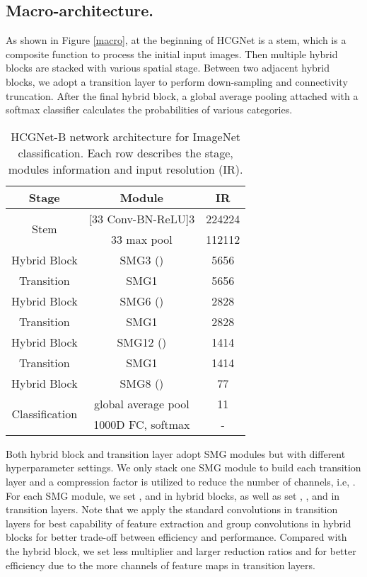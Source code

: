 \documentclass[letterpaper]{article}
\begin{document}
 	\subsection{Macro-architecture.} As shown in Figure \ref{macro}, at the beginning of HCGNet is a stem, which is a composite function to process the initial input images. Then multiple hybrid blocks are stacked with various spatial stage. Between two adjacent hybrid blocks, we adopt a transition layer to perform down-sampling and connectivity truncation. After the final hybrid block, a global average pooling attached with a softmax classifier calculates the probabilities of various categories.
 	
 	\begin{table}[tbp]
 		\centering
 		\caption{HCGNet-B network architecture for ImageNet classification. Each row describes the stage, modules information and input resolution (IR).} 
 		
 		\begin{tabular}{ccc}  
 			
 			\toprule
 			Stage&Module&IR \\
 			\midrule
 			\multirow{2}{*}{Stem}&[33 Conv-BN-ReLU]3&224224\\
 			&33 max pool&112112\\
 			\midrule
 			Hybrid Block&SMG3 ()&5656\\
 			Transition&SMG1&5656\\
 			Hybrid Block&SMG6 ()&2828\\
 			Transition&SMG1&2828\\
 			Hybrid Block&SMG12 ()&1414\\
 			Transition&SMG1&1414\\
 			Hybrid Block&SMG8 ()&77\\
 			\midrule
 			\multirow{2}{*}{Classification}&global average pool&11\\
 			&1000D FC, softmax&-\\
 			\bottomrule
 		\end{tabular}
 		\label{arch}
 	\end{table}
 	
 	Both hybrid block and transition layer adopt SMG modules but with different hyperparameter settings. We only stack one SMG module to build each transition layer and a compression factor  is utilized to reduce the number of channels, i.e, . For each SMG module, we set ,  and  in hybrid blocks, as well as set , ,  and  in transition layers. Note that we apply the standard convolutions in transition layers for best capability of feature extraction and group convolutions in hybrid blocks for better trade-off between efficiency and performance. Compared with the hybrid block, we set less multiplier  and larger reduction ratios  and  for better efficiency due to the more channels of feature maps in transition layers. 
 	
\end{document}
